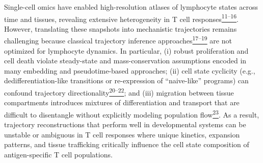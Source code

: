 Single-cell omics have enabled high-resolution atlases of lymphocyte
states across time and tissues, revealing extensive heterogeneity in T
cell
responses\href{https://sciwheel.com/work/citation?ids=17904669,8940021,8917053,15807051,14885142,16689366\&pre=\&pre=\&pre=\&pre=\&pre=\&pre=\&suf=\&suf=\&suf=\&suf=\&suf=\&suf=\&sa=0,0,0,0,0,0\&dbf=0\&dbf=0\&dbf=0\&dbf=0\&dbf=0\&dbf=0}{\textsuperscript{11--16}}.
However, translating these snapshots into mechanistic trajectories
remains challenging because classical trajectory inference
approaches\href{https://sciwheel.com/work/citation?ids=5496398,2919207,9367004\&pre=\&pre=\&pre=\&suf=\&suf=\&suf=\&sa=0,0,0\&dbf=0\&dbf=0\&dbf=0}{\textsuperscript{17--19}}
are not optimized for lymphocyte dynamics. In particular, (i) robust
proliferation and cell death violate steady-state and mass-conservation
assumptions encoded in many embedding and pseudotime-based approaches;
(ii) cell state cyclicity (e.g., dedifferentiation-like transitions or
re-expression of ``naive-like'' programs) can confound trajectory
directionality\href{https://sciwheel.com/work/citation?ids=13729536,4615200,5308353\&pre=\&pre=\&pre=\&suf=\&suf=\&suf=\&sa=0,0,0\&dbf=0\&dbf=0\&dbf=0}{\textsuperscript{20--22}};
and (iii) migration between tissue compartments introduces mixtures of
differentiation and transport that are difficult to disentangle without
explicitly modeling population
flow\href{https://sciwheel.com/work/citation?ids=637212\&pre=\&suf=\&sa=0\&dbf=0}{\textsuperscript{23}}.
As a result, trajectory reconstructions that perform well in
developmental systems can be unstable or ambiguous in T cell responses
where unique kinetics, expansion patterns, and tissue trafficking
critically influence the cell state composition of antigen-specific T
cell populations.

